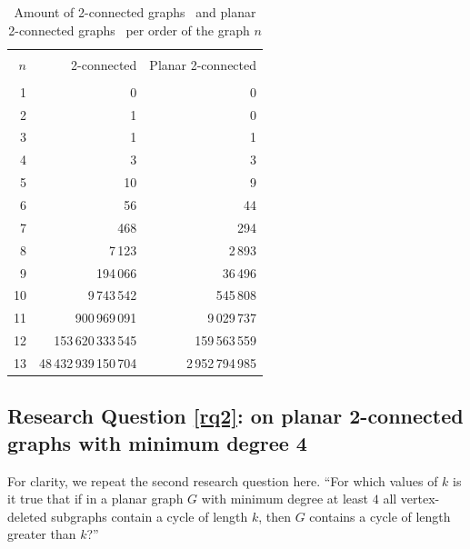 \begin{table}
  \centering
  \caption{Amount of 2-connected graphs~\cite{data:integer-sequence} and planar 2-connected graphs~\cite{data:planar-2con-count} per order of the graph $n$}
  \label{tab:2con-planar}
  \begin{tabular}{rrr}
    \hline\\
    $n$ & 2-connected & Planar 2-connected \\
    \hline \\
    1 & 0 & 0 \\
    2 & 1 & 0 \\
    3 & 1 & 1 \\
    4 & 3 & 3 \\
    5 & 10 & 9 \\
    6 & 56 & 44 \\
    7 & 468 & 294 \\
    8	& 7\,123 & 2\,893 \\
    9	& 194\,066 & 36\,496 \\
    10 & 9\,743\,542 & 545\,808 \\
    11 & 900\,969\,091 & 9\,029\,737 \\
    12 & 153\,620\,333\,545 & 159\,563\,559 \\
    13 & 48\,432\,939\,150\,704 & 2\,952\,794\,985 \\
    \hline
  \end{tabular}
\end{table}


\subsection{Research Question \ref{rq2}: on planar 2-connected graphs with minimum degree 4}

\begin{samepage}
For clarity, we repeat the second research question here. ``For which values of $k$ is it true that if in a planar graph $G$ with minimum degree at least $4$ all vertex-deleted subgraphs contain a cycle of length $k$, then $G$ contains a cycle of length greater than $k$?''
\end{samepage}

